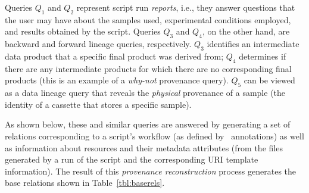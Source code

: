 
Queries $Q_1$ and $Q_2$ represent script run \emph{reports}, i.e.,
they answer questions that the user may have about the samples used,
experimental conditions employed, and results obtained by the script.
Queries $Q_3$ and $Q_4$, on the other hand, are backward and forward
lineage queries, respectively. $Q_3$ identifies an intermediate data
product that a specific final product was derived from; $Q_4$
determines if there are any intermediate products for which there are
no corresponding final products (this is an example of a
\emph{why-not} provenance query). $Q_5$ can be viewed as a data
lineage query that reveals the \emph{physical} provenance of a sample
(the identity of a cassette that stores a specific sample).

As shown below, these and similar queries are answered by generating a
set of relations corresponding to a script's workflow (as defined by
\YW\ annotations) as well as information about resources and their
metadata attributes (from the files generated by a run of the script
and the corresponding URI template information). The result of this
\emph{provenance reconstruction} process generates the base relations
shown in Table~\ref{tbl:baserels}.

